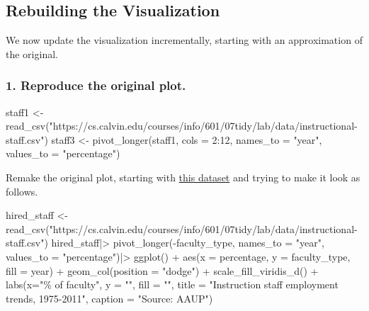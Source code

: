 \documentclass[
]{article}
\newenvironment{Shaded}{\begin{snugshade}}{\end{snugshade}}
\newcommand{\AttributeTok}[1]{\textcolor[rgb]{0.77,0.63,0.00}{#1}}
\newcommand{\DecValTok}[1]{\textcolor[rgb]{0.00,0.00,0.81}{#1}}
\newcommand{\FunctionTok}[1]{\textcolor[rgb]{0.00,0.00,0.00}{#1}}
\newcommand{\NormalTok}[1]{#1}
\newcommand{\OtherTok}[1]{\textcolor[rgb]{0.56,0.35,0.01}{#1}}
\newcommand{\SpecialCharTok}[1]{\textcolor[rgb]{0.00,0.00,0.00}{#1}}
\newcommand{\StringTok}[1]{\textcolor[rgb]{0.31,0.60,0.02}{#1}}
\begin{document}
\hypertarget{rebuilding-the-visualization}{%
\subsection{Rebuilding the
Visualization}\label{rebuilding-the-visualization}}

We now update the visualization incrementally, starting with an
approximation of the original.

\hypertarget{reproduce-the-original-plot.}{%
\subsubsection{1. Reproduce the original
plot.}\label{reproduce-the-original-plot.}}

\begin{Shaded}
\begin{Highlighting}[]
\NormalTok{staff1 }\OtherTok{\textless{}{-}} \FunctionTok{read\_csv}\NormalTok{(}\StringTok{"https://cs.calvin.edu/courses/info/601/07tidy/lab/data/instructional{-}staff.csv"}\NormalTok{)}
\NormalTok{staff3 }\OtherTok{\textless{}{-}} \FunctionTok{pivot\_longer}\NormalTok{(staff1, }\AttributeTok{cols =} \DecValTok{2}\SpecialCharTok{:}\DecValTok{12}\NormalTok{, }\AttributeTok{names\_to =} \StringTok{"year"}\NormalTok{, }\AttributeTok{values\_to =} \StringTok{"percentage"}\NormalTok{)}
\end{Highlighting}
\end{Shaded}

Remake the original plot, starting with
\href{https://cs.calvin.edu/courses/info/601/07tidy/lab/data/instructional-staff.csv}{this
dataset} and trying to make it look as follows.

\begin{Shaded}
\begin{Highlighting}[]
\NormalTok{hired\_staff }\OtherTok{\textless{}{-}} \FunctionTok{read\_csv}\NormalTok{(}\StringTok{"https://cs.calvin.edu/courses/info/601/07tidy/lab/data/instructional{-}staff.csv"}\NormalTok{)}
\NormalTok{hired\_staff}\SpecialCharTok{|\textgreater{}}
  \FunctionTok{pivot\_longer}\NormalTok{(}\SpecialCharTok{{-}}\NormalTok{faculty\_type, }\AttributeTok{names\_to =} \StringTok{"year"}\NormalTok{, }\AttributeTok{values\_to =} \StringTok{"percentage"}\NormalTok{)}\SpecialCharTok{|\textgreater{}}
  \FunctionTok{ggplot}\NormalTok{() }\SpecialCharTok{+}
  \FunctionTok{aes}\NormalTok{(}\AttributeTok{x =}\NormalTok{ percentage, }\AttributeTok{y =}\NormalTok{ faculty\_type, }\AttributeTok{fill =}\NormalTok{ year) }\SpecialCharTok{+}
  \FunctionTok{geom\_col}\NormalTok{(}\AttributeTok{position =} \StringTok{"dodge"}\NormalTok{) }\SpecialCharTok{+}
  \FunctionTok{scale\_fill\_viridis\_d}\NormalTok{() }\SpecialCharTok{+}
  \FunctionTok{labs}\NormalTok{(}\AttributeTok{x=}\StringTok{"\% of faculty"}\NormalTok{,}
       \AttributeTok{y =} \StringTok{""}\NormalTok{,}
       \AttributeTok{fill =} \StringTok{""}\NormalTok{,}
       \AttributeTok{title =} \StringTok{"Instruction staff employment trends, 1975{-}2011"}\NormalTok{,}
       \AttributeTok{caption =} \StringTok{"Source: AAUP"}\NormalTok{)}
\end{Highlighting}
\end{Shaded}
\end{document}
